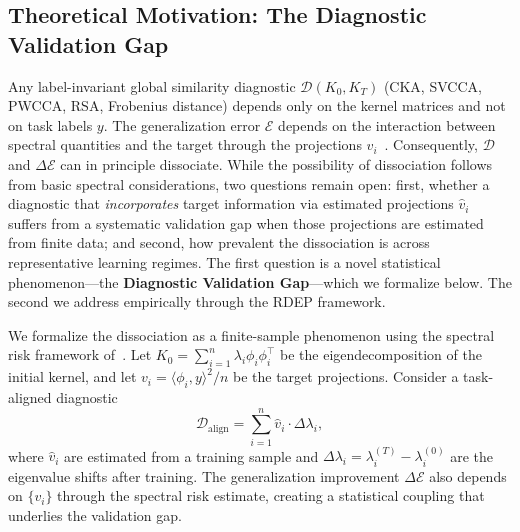 \documentclass[10pt]{article}
\begin{document}
\subsection{Theoretical Motivation: The Diagnostic Validation Gap}
\label{sec:proposition}

Any label-invariant global similarity diagnostic $\mathcal{D}(K_0, K_T)$ (CKA, SVCCA, PWCCA, RSA, Frobenius distance) depends only on the kernel matrices and not on task labels $y$. The generalization error $\mathcal{E}$ depends on the interaction between spectral quantities and the target through the projections $v_i$~\citep{canatar2021spectral}.  Consequently, $\mathcal{D}$ and $\Delta\mathcal{E}$ can in principle dissociate.  While the possibility of dissociation follows from basic spectral considerations, two questions remain open: first, whether a diagnostic that \emph{incorporates} target information via estimated projections $\hat{v}_i$ suffers from a systematic validation gap when those projections are estimated from finite data; and second, how prevalent the dissociation is across representative learning regimes.  The first question is a novel statistical phenomenon---the \textbf{Diagnostic Validation Gap}---which we formalize below.  The second we address empirically through the RDEP framework.

We formalize the dissociation as a finite-sample phenomenon using the spectral risk framework of~\citet{canatar2021spectral}.  Let $K_0 = \sum_{i=1}^n \lambda_i \phi_i \phi_i^\top$ be the eigendecomposition of the initial kernel, and let $v_i = \langle \phi_i, y \rangle^2 / n$ be the target projections.  Consider a task-aligned diagnostic
\[
\mathcal{D}_{\text{align}} = \sum_{i=1}^n \hat{v}_i \cdot \Delta\lambda_i,
\]
where $\hat{v}_i$ are estimated from a training sample and $\Delta\lambda_i = \lambda_i^{(T)} - \lambda_i^{(0)}$ are the eigenvalue shifts after training.  The generalization improvement $\Delta\mathcal{E}$ also depends on $\{v_i\}$ through the spectral risk estimate, creating a statistical coupling that underlies the validation gap.
\end{document}
